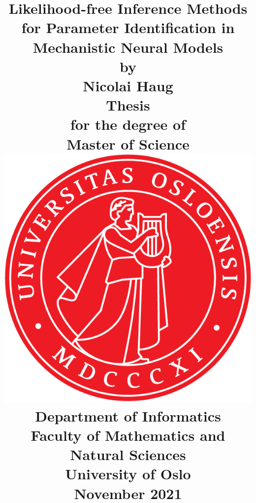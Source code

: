 \title{
    \Large \textbf{Likelihood-free Inference Methods for Parameter Identification in Mechanistic Neural Models}
    \\[8 pt]
    \large by
    \\ [8 pt]
    \large Nicolai Haug
    \\ [40 pt]
    \large \textbf{Thesis}
    \\ [8 pt]
    \large for the degree of
    \\ [8 pt]
    \large \textbf{Master of Science}
    \\ [30 pt]
    \includegraphics[scale=0.9]{latex/latex-report/3_Images/Logo/UiO/UiO_Segl_300dpi.png}
    \\ [30 pt]
    \large Department of Informatics
    \\ [8 pt]
    \large Faculty of Mathematics and Natural Sciences
    \\ [8 pt]
    \large University of Oslo
    \\ [15 pt]
    \large November 2021
}%

\author{\vspace{-5ex}}
\date{\vspace{-5ex}}

\maketitle